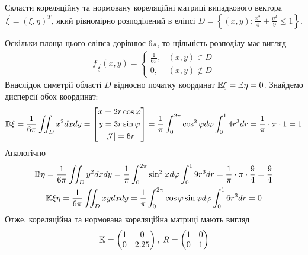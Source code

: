 \begin{example}
    Скласти кореляційну та нормовану кореляційні матриці випадкового вектора $\vec{\xi} = (\xi, \eta)^T$,
    який рівномірно розподілений в еліпсі $D = \left\{(x, y) : \frac{x^2}{4} + \frac{y^2}{9} \leq 1 \right\}$.

    Оскільки площа цього еліпса дорівнює $6\pi$, то щільність розподілу має вигляд
    \begin{gather*}
        f_{\vec{\xi}}(x, y) = \begin{cases}
            \frac{1}{6\pi}, & (x, y) \in D \\
            0, & (x, y) \notin D
        \end{cases}
    \end{gather*}
    Внаслідок симетрії області $D$ відносно початку координат $\mathbb{E}\xi = \mathbb{E}\eta = 0$.
    Знайдемо дисперсії обох координат:
    \begin{gather*}
        \mathbb{D}\xi = \frac{1}{6\pi} \iint_D x^2 dx dy =
        \left[ \begin{gathered}x = 2 r\cos\varphi \\ y = 3 r\sin\varphi \\ |\mathcal{J}| = 6r\end{gathered}\right] =
        \frac{1}{\pi} \int_0^{2\pi}\cos^2 \varphi d\varphi \int_0^1 4 r^3 dr =
        \frac{1}{\pi} \cdot \pi \cdot 1 = 1
    \end{gather*}
    Аналогічно
    \begin{gather*}
        \mathbb{D}\eta = \frac{1}{6\pi} \iint_D y^2 dx dy =
        \frac{1}{\pi} \int_0^{2\pi}\sin^2 \varphi d\varphi \int_0^1 9 r^3 dr =
        \frac{1}{\pi} \cdot \pi \cdot \frac{9}{4} = \frac{9}{4} 
        \\
        \mathbb{K}\xi\eta = \frac{1}{6\pi}\iint_D xy dx dy = 
        \frac{1}{\pi} \int_0^{2\pi} \cos\varphi \sin\varphi d\varphi \int_0^1 6 r^3 dr = 0
    \end{gather*}
    Отже, кореляційна та нормована кореляційна матриці мають вигляд
    \begin{gather*}
        \mathbb{K} = \begin{pmatrix}
            1 & 0 \\
            0 & 2.25
        \end{pmatrix}, \;
        R = \begin{pmatrix}
            1 & 0 \\
            0 & 1
        \end{pmatrix}
    \end{gather*}
\end{example}